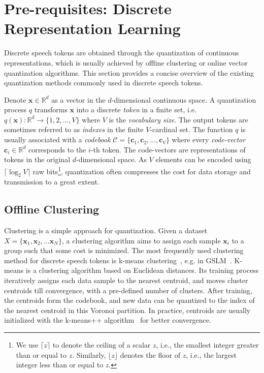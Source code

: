 \section{Pre-requisites: Discrete Representation Learning}
\label{sec:prereq}

Discrete speech tokens are obtained through the quantization of continuous representations, which is usually achieved by offline clustering or online vector quantization algorithms.
This section provides a concise overview of the existing quantization methods commonly used in discrete speech tokens.

Denote $\bm x\in \mathbb R^d$ as a vector in the $d$-dimensional continuous space. A quantization process $q$ transforms $\bm x$ into a discrete \textit{token} in a finite set, i.e. $q(\bm x): \mathbb R^d\to\{1,2,...,V\}$ where $V$ is the \textit{vocabulary size}.
The output tokens are sometimes referred to as \textit{indexes} in the finite $V$-cardinal set.
The function $q$ is usually associated with a \textit{codebook} $\mathcal C=\{\bm c_1,\bm c_2,...,\bm c_V\}$ where every \textit{code-vector} $\bm c_i\in\mathbb R^d$ corresponds to the $i$-th token. 
The code-vectors are representations of tokens in the original $d$-dimensional space.
As $V$ elements can be encoded using $\lceil \log_2 V\rceil$ raw bits\footnote{We use $\lceil z\rceil$ to denote the ceiling of a scalar $z$, i.e., the smallest integer greater than or equal to $z$. 
Similarly, $\lfloor z\rfloor$ denotes the floor of $z$, i.e., the largest integer less than or equal to $z$.}, quantization often compresses the cost for data storage and transmission to a great extent.

\vspace{-0.15in}
\subsection{Offline Clustering}
\vspace{-0.05in}
Clustering is a simple approach for quantization. 
Given a dataset $X=\{\bm x_1,\bm x_2,...\bm x_N\}$, a clustering algorithm aims to assign each sample $\bm x_i$ to a group such that some cost is minimized.
The most frequently used clustering method for discrete speech tokens is k-means clustering~\cite{IKOTUN2023178}, e.g. in GSLM~\cite{lakhotia2021generative}.
K-means is a clustering algorithm based on Euclidean distances.
Its training process iteratively assigns each data sample to the nearest centroid, and moves cluster centroids till convergence, with a pre-defined number of clusters.
After training, the centroids form the codebook, and new data can be quantized to the index of the nearest centroid in this Voronoi partition.
In practice, centroids are usually initialized with the k-means++ algorithm~\cite{kmeans++} for better convergence.

